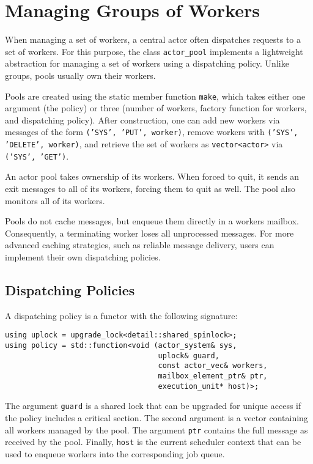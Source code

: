 \section{Managing Groups of Workers \experimental}
\label{worker-groups}

When managing a set of workers, a central actor often dispatches requests to a
set of workers. For this purpose, the class \lstinline^actor_pool^ implements a
lightweight abstraction for managing a set of workers using a dispatching
policy. Unlike groups, pools usually own their workers.

Pools are created using the static member function \lstinline^make^, which
takes either one argument (the policy) or three (number of workers, factory
function for workers, and dispatching policy). After construction, one can add
new workers via messages of the form \texttt{('SYS', 'PUT', worker)}, remove
workers with \texttt{('SYS', 'DELETE', worker)}, and retrieve the set of
workers as \lstinline^vector<actor>^ via \texttt{('SYS', 'GET')}.

An actor pool takes ownership of its workers. When forced to quit, it sends an
exit messages to all of its workers, forcing them to quit as well. The pool
also monitors all of its workers.

Pools do not cache messages, but enqueue them directly in a workers mailbox.
Consequently, a terminating worker loses all unprocessed messages. For more
advanced caching strategies, such as reliable message delivery, users can
implement their own dispatching policies.

\subsection{Dispatching Policies}

A dispatching policy is a functor with the following signature:

\begin{lstlisting}
using uplock = upgrade_lock<detail::shared_spinlock>;
using policy = std::function<void (actor_system& sys,
                                   uplock& guard,
                                   const actor_vec& workers,
                                   mailbox_element_ptr& ptr,
                                   execution_unit* host)>;
\end{lstlisting}

The argument \lstinline^guard^ is a shared lock that can be upgraded for unique
access if the policy includes a critical section. The second argument is a
vector containing all workers managed by the pool. The argument \lstinline^ptr^
contains the full message as received by the pool. Finally, \lstinline^host^ is
the current scheduler context that can be used to enqueue workers into the
corresponding job queue.

